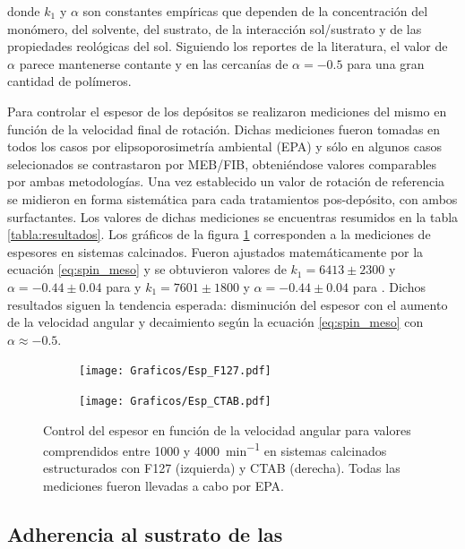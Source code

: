		\noindent donde $k_1$ y $\alpha$ son constantes empíricas que dependen de la concentración del monómero, del solvente, del sustrato, de la interacción sol/sustrato y  de las propiedades reológicas del sol. Siguiendo los reportes de la literatura, el valor de $\alpha$ parece mantenerse contante y en las cercanías de $\alpha=-0.5$ para una gran cantidad de polímeros.\cite{Meyerhofer1978,Bornside1989,Lora1990}

		Para controlar el espesor de los depósitos se realizaron mediciones del mismo en función de la velocidad final de rotación.  Dichas mediciones fueron tomadas en todos los casos por elipsoporosimetría ambiental (EPA) y sólo en algunos casos selecionados se contrastaron por MEB/FIB, obteniéndose valores comparables por ambas metodologías. Una vez establecido un valor de rotación de referencia se midieron en forma sistemática para cada tratamientos pos-depósito, con ambos surfactantes. Los valores de dichas mediciones se encuentras resumidos en la tabla \ref{tabla:resultados}.
		Los gráficos de la figura \ref{fig:esp} corresponden a la mediciones de espesores en sistemas calcinados. Fueron ajustados matemáticamente por la ecuación \ref{eq:spin_meso} y se obtuvieron valores de $k_1=6413\pm 2300$ y $\alpha=-0.44 \pm 0.04$ para \pdmF\space y $k_1=7601\pm 1800$ y $\alpha=-0.44 \pm 0.04$ para \pdmC. Dichos resultados siguen la tendencia esperada: disminución del espesor con el aumento de la velocidad angular y decaimiento según la ecuación \ref{eq:spin_meso} con $\alpha \approx -0.5$. 

		
			\begin{figure}[!ht]
				\begin{subfigure}[t]{0.495\textwidth}
				\texttt{[image: Graficos/Esp\_F127.pdf]}
				\end{subfigure}
				\begin{subfigure}[t]{0.495\textwidth}
				\texttt{[image: Graficos/Esp\_CTAB.pdf]}
				\end{subfigure}
				\caption[Espesor en función de la velocidad angular]{Control del espesor en función de la velocidad angular para valores comprendidos entre 1000 y \SI{4000}{\minute^{-1}} en sistemas calcinados estructurados con F127 (izquierda) y CTAB (derecha). Todas las mediciones fueron llevadas a cabo por EPA.}
				\label{fig:esp}		
				\end{figure}
	
	\subsection{Adherencia al sustrato de las \pdm}	


